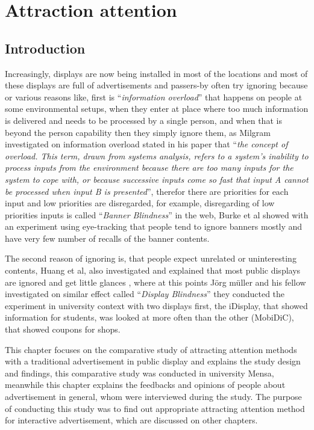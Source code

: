 
\chapter{Attraction attention} %

\label{Chapter3} %
\newpage

\section{Introduction}

Increasingly, displays are now being installed in most of the locations and most of these displays are full of advertisements and passers-by often try ignoring because or various reasons like, first is ``\emph{information overload}'' that happens on people at some environmental setups, when they enter at place where too much information is delivered and needs to be processed by a single person, and when that is beyond the person capability then they simply ignore them, as Milgram \cite{Information_overload} investigated on information overload stated in his paper that ``\emph{the concept of overload. This term, drawn from systems analysis, refers to a system's inability to process inputs from the environment because there are too many inputs for the system to cope with, or because successive inputs come so fast that input A cannot be processed when input B is presented}'', therefor there are priorities for each input and low priorities are disregarded, for example, disregarding of low priorities inputs is called ``\emph{Banner Blindness}'' in the web, Burke et al \cite{banner_blindness} showed with an experiment using eye-tracking that people tend to ignore banners mostly and have very few number of recalls of the banner contents.

The second reason of ignoring is, that people expect unrelated or uninteresting contents, Huang et al, also investigated and explained that most public displays are ignored and get little glances \cite{When_display}, where at this points Jörg müller and his fellow \cite{display_blindness} investigated on similar effect called ``\emph{Display Blindness}'' they conducted the experiment in university context with two displays first, the iDisplay, that showed information for students, was looked at more often than the other (MobiDiC), that showed coupons for shops. 

This chapter focuses on the comparative study of attracting attention methods with a traditional advertisement in public display and explains the study design and findings, this comparative study was conducted in university Mensa, meanwhile this chapter explains the feedbacks and opinions of people about advertisement in general, whom were interviewed during the study. The purpose of conducting this study was to find out appropriate attracting attention method for interactive advertisement, which are discussed on other chapters.



